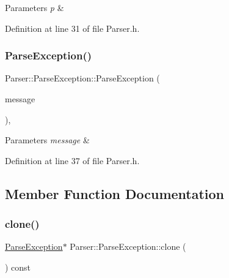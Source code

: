 \begin{DoxyParams}{Parameters}
{\em p} & \\
\hline
\end{DoxyParams}


Definition at line 31 of file Parser.\+h.

\mbox{\label{class_parser_1_1_parse_exception_a86f3e7a206b7c023df000c3eebdab758}} 
\subsubsection{\texorpdfstring{Parse\+Exception()}{ParseException()}\hspace{0.1cm}{\footnotesize\ttfamily [3/3]}}
{\footnotesize\ttfamily Parser\+::\+Parse\+Exception\+::\+Parse\+Exception (\begin{DoxyParamCaption}\item[{const Q\+String \&}]{message }\end{DoxyParamCaption})\hspace{0.3cm}{\ttfamily [inline]}, {\ttfamily [explicit]}}


\begin{DoxyParams}{Parameters}
{\em message} & \\
\hline
\end{DoxyParams}


Definition at line 37 of file Parser.\+h.



\subsection{Member Function Documentation}
\mbox{\label{class_parser_1_1_parse_exception_aa3c6a6636cc6b8c0a9bf82fc2e62eb11}} 
\subsubsection{\texorpdfstring{clone()}{clone()}}
{\footnotesize\ttfamily \hyperlink{class_parser_1_1_parse_exception}{Parse\+Exception}$\ast$ Parser\+::\+Parse\+Exception\+::clone (\begin{DoxyParamCaption}{ }\end{DoxyParamCaption}) const\hspace{0.3cm}{\ttfamily [inline]}}


